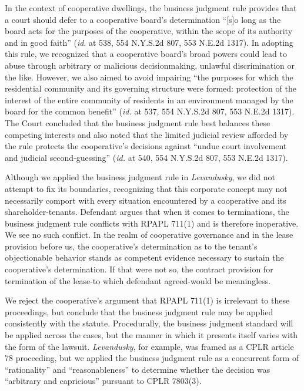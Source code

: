 In the context of cooperative dwellings, the business judgment rule provides
that a court should defer to a cooperative board's determination ``[s]o long as
the board acts for the purposes of the cooperative, within the scope of its
authority and in good faith'' (\textit{id}. at 538, 554 N.Y.S.2d 807, 553 N.E.2d
1317). In adopting this rule, we recognized that a cooperative board's broad
powers could lead to abuse through arbitrary or malicious decisionmaking,
unlawful discrimination or the like. However, we also aimed to avoid impairing
``the purposes for which the residential community and its governing structure
were formed: protection of the interest of the entire community of residents in
an environment managed by the board for the common benefit'' (\textit{id.} at
537, 554 N.Y.S.2d 807, 553 N.E.2d 1317). The Court concluded that the business
judgment rule best balances these competing interests and also noted that the
limited judicial review afforded by the rule protects the cooperative's
decisions against ``undue court involvement and judicial second-guessing''
(\textit{id.} at 540, 554 N.Y.S.2d 807, 553 N.E.2d 1317).

Although we applied the business judgment rule in \textit{Levandusky}, we did
not attempt to fix its boundaries, recognizing that this corporate concept may
not necessarily comport with every situation encountered by a cooperative and
its shareholder-tenants. Defendant argues that when it comes to terminations,
the business judgment rule conflicts with RPAPL 711(1) and is therefore
inoperative. We see no such
conflict. In the realm of cooperative governance and in the lease provision
before us, the cooperative's determination as to the tenant's objectionable
behavior stands as competent evidence necessary to sustain the cooperative's
determination. If that were not so, the contract provision for termination of
the lease-to which defendant agreed-would be meaningless.

We reject the cooperative's argument that RPAPL 711(1) is irrelevant to these
proceedings, but conclude that the business judgment rule may be applied
consistently with the statute. Procedurally, the business judgment standard will
be applied across the cases, but the manner in which it presents itself varies
with the form of the lawsuit. \textit{Levandusky}, for example, was framed as a
CPLR article 78 proceeding, but we applied the business judgment rule as a
concurrent form of ``rationality'' and ``reasonableness'' to determine whether
the decision was ``arbitrary and capricious'' pursuant to CPLR 7803(3).

